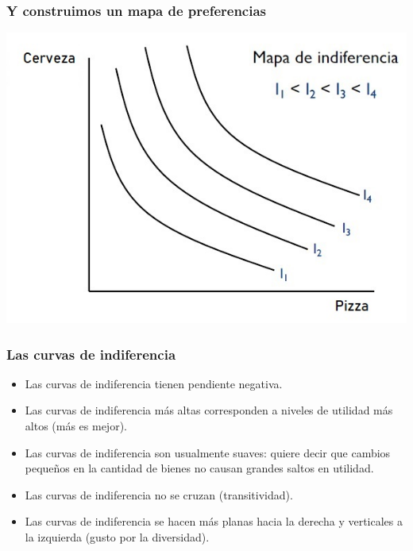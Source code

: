 \documentclass{beamer}
\begin{document}
\begin{frame}
\frametitle{Y construimos un mapa de preferencias}
\centering
\includegraphics[scale=0.6]{Slides Principios de Economia/Figures/Tema_02.16_rp14.jpg}
\end{frame}

\begin{frame}
\frametitle{Las curvas de indiferencia}
\begin{itemize}
    \item Las curvas de indiferencia tienen pendiente negativa. 
    \item Las curvas de indiferencia más altas corresponden a niveles de utilidad más altos (más es mejor).
    \item Las curvas de indiferencia son usualmente suaves: quiere decir que cambios pequeños en la cantidad de bienes no causan grandes saltos en utilidad.
    \item Las curvas de indiferencia no se cruzan (transitividad). 
    \item Las curvas de indiferencia se hacen más planas hacia la derecha y verticales a la izquierda (gusto por la diversidad).
\end{itemize} 
\end{frame}
\end{document}
